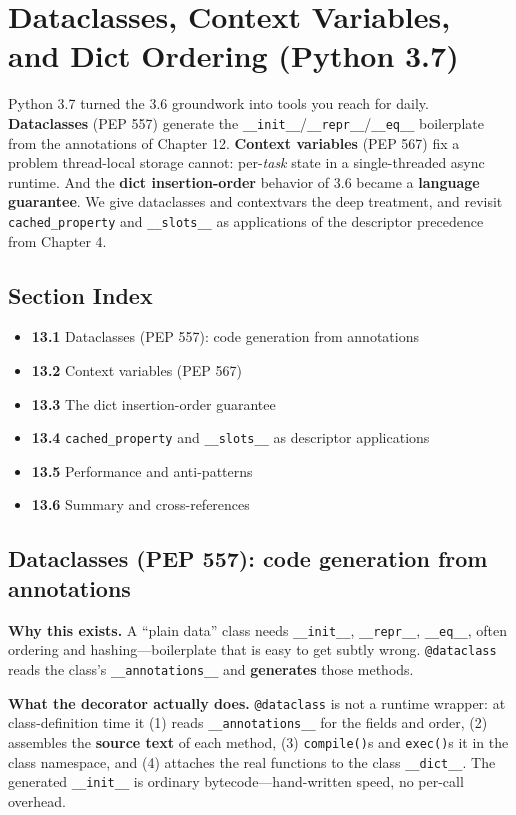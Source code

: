 \chapter{Dataclasses, Context Variables, and Dict Ordering (Python 3.7)}

Python 3.7 turned the 3.6 groundwork into tools you reach for daily. \textbf{Dataclasses} (PEP 557)
generate the \texttt{\_\_init\_\_}/\texttt{\_\_repr\_\_}/\texttt{\_\_eq\_\_} boilerplate from the
annotations of Chapter 12. \textbf{Context variables} (PEP 567) fix a problem thread-local storage
cannot: per-\emph{task} state in a single-threaded async runtime. And the \textbf{dict
insertion-order} behavior of 3.6 became a \textbf{language guarantee}. We give dataclasses and
contextvars the deep treatment, and revisit \texttt{cached\_property} and \texttt{\_\_slots\_\_} as
applications of the descriptor precedence from Chapter 4.

\section*{Section Index}
\begin{itemize}
  \item \textbf{13.1} Dataclasses (PEP 557): code generation from annotations
  \item \textbf{13.2} Context variables (PEP 567)
  \item \textbf{13.3} The dict insertion-order guarantee
  \item \textbf{13.4} \texttt{cached\_property} and \texttt{\_\_slots\_\_} as descriptor applications
  \item \textbf{13.5} Performance and anti-patterns
  \item \textbf{13.6} Summary and cross-references
\end{itemize}

\section{Dataclasses (PEP 557): code generation from annotations}

\textbf{Why this exists.} A ``plain data'' class needs \texttt{\_\_init\_\_},
\texttt{\_\_repr\_\_}, \texttt{\_\_eq\_\_}, often ordering and hashing---boilerplate that is easy to
get subtly wrong. \texttt{@dataclass} reads the class's \texttt{\_\_annotations\_\_} and
\textbf{generates} those methods.

\textbf{What the decorator actually does.} \texttt{@dataclass} is not a runtime wrapper: at
class-definition time it (1) reads \texttt{\_\_annotations\_\_} for the fields and order,
(2) assembles the \textbf{source text} of each method, (3) \texttt{compile()}s and \texttt{exec()}s
it in the class namespace, and (4) attaches the real functions to the class \texttt{\_\_dict\_\_}.
The generated \texttt{\_\_init\_\_} is ordinary bytecode---hand-written speed, no per-call overhead.

